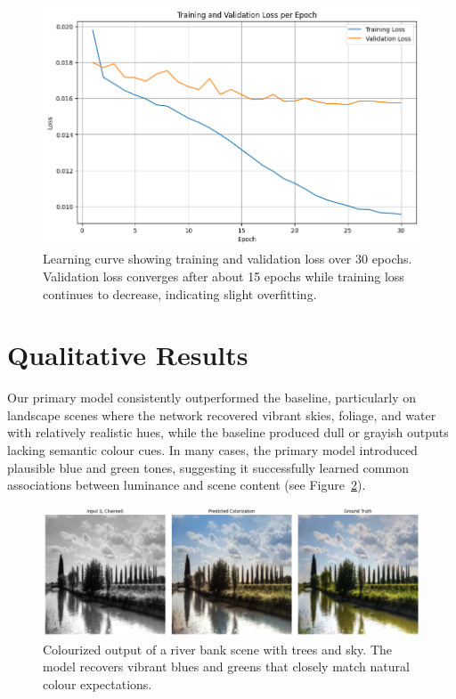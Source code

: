 \documentclass{article} %
\begin{document}
\begin{figure}[htbp]            %
  \centering
  \includegraphics[width=0.9\linewidth]{Figs/loss_curve.png}
  \caption{Learning curve showing training and validation loss over 30 epochs. Validation loss converges after about 15 epochs while training loss continues to decrease, indicating slight overfitting.}
  \label{fig:loss_curve}
\end{figure}

\section{Qualitative Results}
\label{qual_results}

Our primary model consistently outperformed the baseline, particularly on landscape scenes where the network recovered vibrant skies, foliage, and water with relatively realistic hues, 
while the baseline produced dull or grayish outputs lacking semantic colour cues. In many cases, the primary model introduced plausible blue and green tones, suggesting it successfully 
learned common associations between luminance and scene content (see Figure~\ref{fig:landscape_comparison}).

\begin{figure}[H]
  \centering
  \includegraphics[width=0.9\linewidth]{Figs/landscape-result-example.png}
  \caption{Colourized output of a river bank scene with trees and sky. The model recovers vibrant blues and greens that closely match natural colour expectations.}
  \label{fig:landscape_comparison}
\end{figure}
\end{document}
